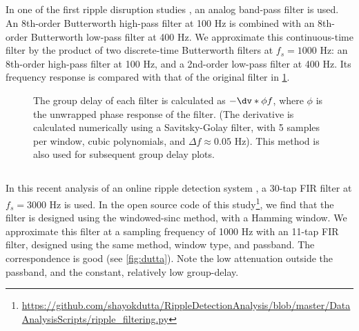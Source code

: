 \subsection{}

In one of the first ripple disruption studies \cite{Ego-Stengel2009}, an analog band-pass filter is used. An 8th-order Butterworth high-pass filter at 100 Hz is combined with an 8th-order Butterworth low-pass filter at 400 Hz.
We approximate this continuous-time filter by the product of two discrete-time Butterworth filters at $f_s = 1000$ Hz: an 8th-order high-pass filter at 100 Hz, and a 2nd-order low-pass filter at 400 Hz.\footnotemark{} Its frequency response is compared with that of the original filter in \cref{fig:ego-stengel}.


\begin{figure}
{The group delay of each filter is calculated as $-\dv*{\phi}{f}$, where $\phi$ is the unwrapped phase response of the filter. (The derivative is calculated numerically using a Savitsky-Golay filter, with 5 samples per window, cubic polynomials, and $\Delta f \approx 0.05$ Hz). This method is also used for subsequent group delay plots.}
\label{fig:ego-stengel}
\end{figure}


\subsection{}

In this recent analysis of an online ripple detection system \cite{Dutta2018}, a 30-tap FIR filter at $f_s = 3000$ Hz is used. In the open source code of this study\footnote{\url{https://github.com/shayokdutta/RippleDetectionAnalysis/blob/master/DataAnalysisScripts/ripple_filtering.py}}, we find that the filter is designed using the windowed-sinc method, with a Hamming window. We approximate this filter at a sampling frequency of 1000 Hz with an 11-tap FIR filter, designed using the same method, window type, and passband. The correspondence is good (see \cref{fig:dutta}). Note the low attenuation outside the passband, and the constant, relatively low group-delay.

